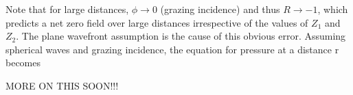 Note that for large distances, $\phi \to 0$ (grazing incidence) and thus $R \to -1$, which predicts a net zero field over large distances irrespective of the values of $Z_1$ and $Z_2$. The plane wavefront assumption is the cause of this obvious error. Assuming spherical waves and grazing incidence, the equation for pressure at a distance r becomes

MORE ON THIS SOON!!!